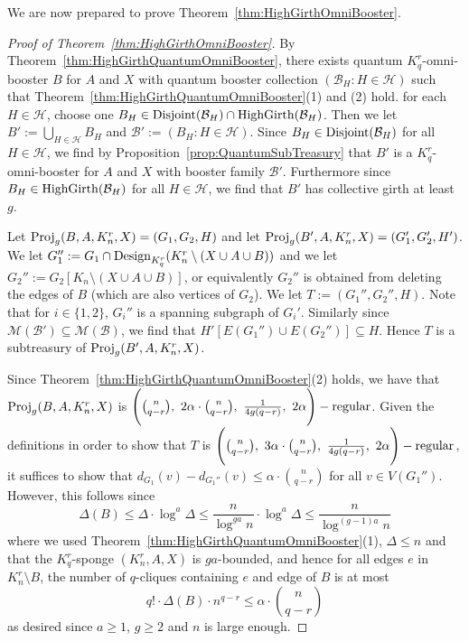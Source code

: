 \documentclass[11pt]{article}
\newcommand{\mc}[1]{\mathcal{#1}}
\newcounter{i}
\theoremstyle{plain}
\theoremstyle{plain} %
\theoremstyle{definition}
\begin{document}
We are now prepared to prove Theorem~\ref{thm:HighGirthOmniBooster}.

\begin{proof}[Proof of Theorem~\ref{thm:HighGirthOmniBooster}]
By Theorem~\ref{thm:HighGirthQuantumOmniBooster}, there exists quantum $K_q^r$-omni-booster $B$ for $A$ and $X$ with quantum booster collection $(\mathcal{B}_H: H\in \mathcal{H})$ such that  Theorem~\ref{thm:HighGirthQuantumOmniBooster}(1) and (2) hold. for each $H\in \mc{H}$, choose one $B_H\in {\rm Disjoint}(\mc{B}_H) \cap {\rm HighGirth}(\mc{B}_H)$. Then we let $B':=\bigcup_{H\in \mc{H}} B_H$ and $\mc{B}':=(B_H: H\in \mc{H})$. Since $B_H\in {\rm Disjoint}(\mc{B}_H)$ for all $H\in \mc{H}$, we find by Proposition~\ref{prop:QuantumSubTreasury} that $B'$ is  a $K_q^r$-omni-booster for $A$ and $X$ with booster family $\mc{B}'$. Furthermore since $B_H\in {\rm HighGirth}(\mc{B}_H)$ for all $H\in \mc{H}$, we find that $B'$ has collective girth at least $g$.

Let ${\rm Proj}_g(B,A,K_n^r,X)=(G_1,G_2,H)$ and let ${\rm Proj}_g(B',A,K_n^r,X)=(G_1',G_2',H')$. We let $G_1'':= G_1\cap {\rm Design}_{K_q^r}(K_n^r\setminus (X\cup A\cup B))$ and we let $G_2'':= G_2[K_n\setminus (X\cup A\cup B)]$, or equivalently $G_2''$ is obtained from deleting the edges of $B$ (which are also vertices of $G_2$). We let $T:=(G_1'',G_2'',H)$. Note that for $i\in \{1,2\}$, $G_i''$ is a spanning subgraph of $G_i'$. Similarly since $\mc{M}(\mc{B}') \subseteq \mc{M}(\mc{B})$, we find that $H'[E(G_1'')\cup E(G_2'')]\subseteq H$. Hence $T$ is a subtreasury of ${\rm Proj}_g(B',A,K_n^r,X)$.  

Since Theorem~\ref{thm:HighGirthQuantumOmniBooster}(2) holds, we have that 
${\rm Proj}_g(B,A,K_n^r,X)$ is $\Bigg(\binom{n}{q-r},~2\alpha \cdot \binom{n}{q-r},~\frac{1}{4g(q-r)},~2\alpha\Bigg)-{\rm regular}$. Given the definitions in order to show that $T$ is $\Bigg(\binom{n}{q-r},~3\alpha \cdot \binom{n}{q-r},~\frac{1}{4g(q-r)},~2\alpha\Bigg)-{\rm regular}$, it suffices to show that $d_{G_1}(v)-d_{G_1''}(v) \le \alpha\cdot \binom{n}{q-r}$ for all $v\in V(G_1'')$. However, this follows since 
$$\Delta(B)\le \Delta\cdot \log^a \Delta \le \frac{n}{\log^{ga} n}\cdot \log^a \Delta \le \frac{n}{\log^{(g-1)a}n}$$ 
where we used Theorem~\ref{thm:HighGirthQuantumOmniBooster}(1), $\Delta \le n$ and that the $K_q^r$-sponge $(K_n^r,A,X)$ is $ga$-bounded, and hence for all edges $e$ in $K_n^r\setminus B$, the number of $q$-cliques containing $e$ and edge of $B$ is at most 
$$q!\cdot \Delta(B)\cdot n^{q-r} \le \alpha\cdot \binom{n}{q-r}$$
as desired since $a\ge 1$, $g\ge 2$ and $n$ is large enough.
\end{proof}
\end{document}
